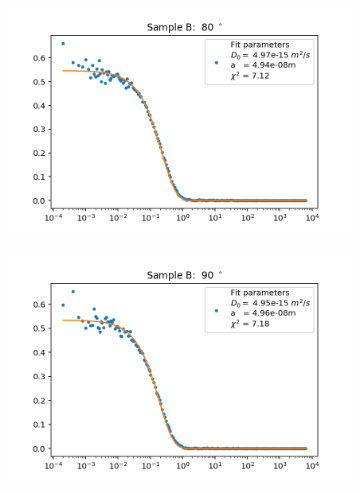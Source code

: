 \documentclass[]{article}
\begin{document}
\begin{figure}[!h]
\centering

\medskip
\begin{subfigure}{0.48\textwidth}
\includegraphics[width=\linewidth]{Plots/B/80.png}
\end{subfigure}
\begin{subfigure}[c]{0.48\linewidth}
\includegraphics[width=\linewidth]{Plots/B/90.png}
\end{subfigure}


\end{figure}
\end{document}
